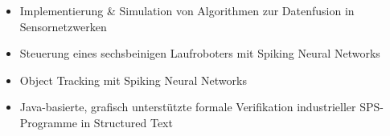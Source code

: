 \begin{itemize}
  \item Implementierung \& Simulation von Algorithmen zur Datenfusion in Sensornetzwerken
\end{itemize}

\begin{itemize}
  \item Steuerung eines sechsbeinigen Laufroboters mit Spiking Neural Networks\hfill {}
  \item Object Tracking mit Spiking Neural Networks\hfill {}
\end{itemize}

\begin{itemize}
  \item Java-basierte, grafisch unterstützte formale Verifikation industrieller SPS-Programme in Structured Text
\end{itemize}
